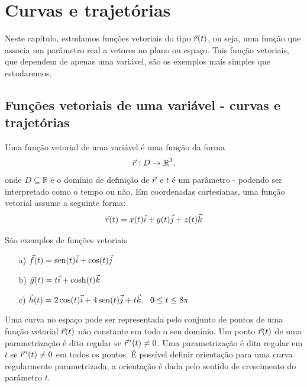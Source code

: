 %


\chapter{Curvas e trajetórias}
  Neste capítulo, estudamos funções vetoriais do tipo $\vec{r}(t)$, ou seja, uma função que associa um parâmetro real a vetores no plano ou espaço. Tais função vetoriais, que dependem de apenas uma variável, são os exemplos mais simples que estudaremos. %

\section{Funções vetoriais de uma variável - curvas e trajetórias}
Uma função vetorial de uma variável é uma função da forma $$\vec{r}:D\to \mathbb{R}^3,$$ onde $D\subseteq \mathbb{R}$ é o domínio de definição de $\vec{r}$ e $t$ é um parâmetro - podendo ser interpretado como o tempo ou não. Em coordenadas cartesianas, uma função vetorial assume a seguinte forma:
$$\vec{r}(t)=x(t)\vec{i}+y(t)\vec{j}+z(t)\vec{k}$$
\begin{ex}\label{exfv1} São exemplos de funções vetoriais
\begin{itemize}
\item [a)] $\vec{f}(t)=\operatorname{sen}(t)\vec{i}+\cos(t)\vec{j}$
\item [b)] $\vec{g}(t)=t \vec{i}+\cosh(t)\vec{k}$
\item [c)] $\vec{h}(t)=2\cos(t)\vec{i}+4\operatorname{sen}(t)\vec{j}+t\vec{k},~~ 0\leq t \leq 8\pi$
\end{itemize}
\end{ex}  

Uma curva no espaço pode ser representada pelo conjunto de pontos de uma função vetorial $\vec{r}(t)$ não constante em todo o seu domínio. Um ponto $\vec{r}(t)$ de uma parametrização é dito regular se $\vec{r}\!~'(t)\neq 0$. Uma parametrização é dita regular em $t$ se $\vec{r}~\!'(t)\neq 0$ em todos os pontos. É possível definir orientação para uma curva regularmente parametrizada, a orientação é dada pelo sentido de crescimento do parâmetro $t$. 

